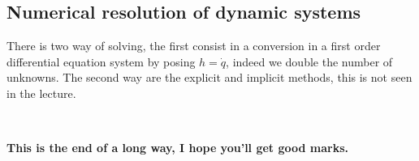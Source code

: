 \subsection{Numerical resolution of dynamic systems}
There is two way of solving, the first consist in a conversion in a first order differential equation system by posing $h = \dot{q}$, indeed we double the number of unknowns. The second way are the explicit and implicit methods, this is not seen in the lecture. 

\ \\


\begin{center}
\textbf{This is the end of a long way, I hope you'll get good marks.}
\end{center}